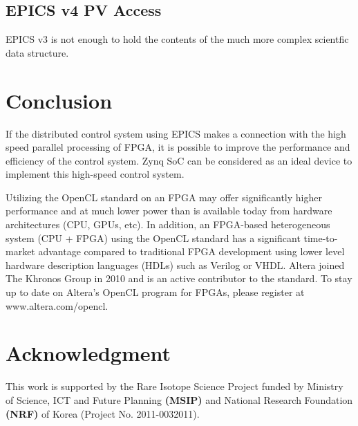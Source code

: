 \documentclass[journal]{IEEEtran}
\begin{document}
\subsection{EPICS v4 PV Access}
EPICS v3 is not enough to hold the contents of the much more complex scientfic data structure. 

\section{Conclusion}

If the distributed control system using EPICS makes a connection with the high speed parallel processing of FPGA, it is possible to improve the performance and efficiency of the control system. Zynq SoC can be considered as an ideal device to implement this high-speed control system.

Utilizing the OpenCL standard on an FPGA may offer significantly higher performance and at much lower power than is available today from hardware architectures (CPU, GPUs, etc). In addition, an FPGA-based heterogeneous system (CPU + FPGA) using the OpenCL standard has a significant time-to-market advantage compared to traditional FPGA development using lower level hardware description languages (HDLs) such as Verilog or VHDL. Altera joined The Khronos Group in 2010 and is an active contributor to the standard. To stay up to date on Altera’s OpenCL program for FPGAs, please register at www.altera.com/opencl.

\section*{Acknowledgment}
This work is supported by the Rare Isotope Science Project funded by Ministry of Science, ICT and Future Planning \textbf{(MSIP)} and National Research Foundation \textbf{(NRF)} of Korea (Project No. 2011-0032011).


\end{document}
